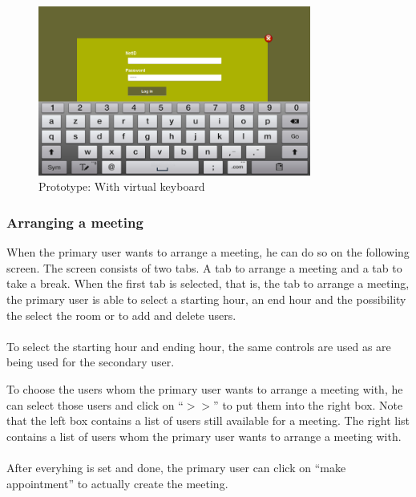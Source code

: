 \documentclass[11pt, a4paper,svglistings]{report}
\begin{document}
\begin{figure}[H]
\centering
    \includegraphics[width=0.8\textwidth]{Prototypes/LoginNamePassKeyboard.png}
  \caption{Prototype: With virtual keyboard}
\end{figure}


\subsubsection{Arranging a meeting}

When the primary user wants to arrange a meeting, he can do so on the following screen. The screen consists of two tabs. A tab to arrange a meeting and a tab to take a break. When the first tab is selected, that is, the tab to arrange a meeting, the primary user is able to select a starting hour, an end hour and the possibility the select the room or to add and delete users. \\ \\
To select the starting hour and ending hour, the same controls are used as are being used for the secondary user.

To choose the users whom the primary user wants to arrange a meeting with, he can select those users and click on ``$>>$'' to put them into the right box. Note that the left box contains a list of users still available for a meeting. The right list contains a list of users whom the primary user wants to arrange a meeting with. \\ \\
After everyhing is set and done, the primary user can click on ``make appointment'' to actually create the meeting.
\end{document}
